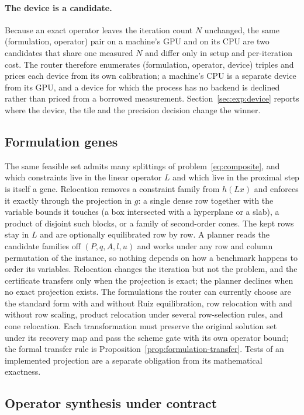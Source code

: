 \paragraph{The device is a candidate.}
Because an exact operator leaves the iteration count $N$ unchanged, the same
(formulation, operator) pair on a machine's GPU and on its CPU are two
candidates that share one measured $N$ and differ only in setup and per-iteration
cost. The router therefore enumerates (formulation, operator, device) triples
and prices each device from its own calibration; a machine's CPU is a separate
device from its GPU, and a device for which the process has no backend is
declined rather than priced from a borrowed measurement.
Section~\ref{sec:exp:device} reports where the device, the tile and the
precision decision change the winner.


\subsection{Formulation genes}

The same feasible set admits many splittings of problem~\eqref{eq:composite},
and which constraints live in the linear operator $L$ and which live in the
proximal step is itself a gene. Relocation removes a constraint family from
$h(Lx)$ and enforces it exactly through the projection in $g$: a single dense
row together with the variable bounds it touches (a box intersected with a
hyperplane or a slab), a product of disjoint such blocks, or a family of
second-order cones. The kept rows stay in $L$ and are optionally equilibrated
row by row. A planner reads the candidate families off $(P, q, A, l, u)$ and
works under any row and column permutation of the instance, so nothing depends
on how a benchmark happens to order its variables. Relocation changes the
iteration but not the problem, and the certificate transfers only when the
projection is exact; the planner declines when no exact projection exists.
The formulations the router can currently choose are the standard form with
and without Ruiz equilibration, row relocation with and without row scaling,
product relocation under several row-selection rules, and cone relocation.
Each transformation must preserve the original solution set under its recovery
map and pass the scheme gate with its own operator bound; the formal transfer
rule is Proposition~\ref{prop:formulation-transfer}. Tests of an implemented
projection are a separate obligation from its mathematical exactness.


\subsection{Operator synthesis under contract}

